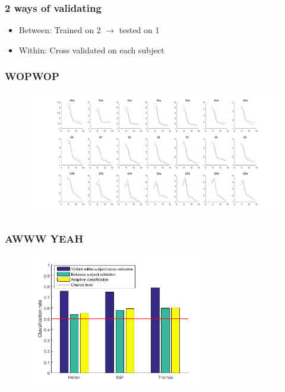 \documentclass{beamer}
\begin{document}
\begin{frame}

\frametitle{2 ways of validating}
 \begin{itemize}
   \item Between: Trained on 2 $\rightarrow$ tested on 1
   \item Within: Cross validated on each subject
 \end{itemize}

\end{frame}

\begin{frame}
  \frametitle{WOPWOP}

 \begin{figure}
  \centering
     \includegraphics[width=1.0\textwidth]{distinction.png}
 \end{figure}

\end{frame}

\begin{frame}
  \frametitle{AWWW YEAH}

 \begin{figure}
  \centering
     \includegraphics[width=0.7\textwidth]{bars.png}
 \end{figure}

\end{frame}
\end{document}
